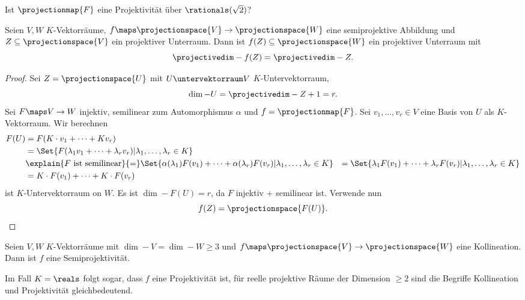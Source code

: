 \begin{frage*}
  Ist \( \projectionmap{F} \) eine Projektivität über \( \rationals(\sqrt{2}) \)?
\end{frage*}
\begin{lemma}
  Seien \( V,W \) \( K \)-Vektorräume, \( f\maps \projectionspace{V}\to \projectionspace{W} \) eine semiprojektive Abbildung und \( Z\subseteq \projectionspace{V} \) ein projektiver Unterraum. Dann ist \( f(Z)\subseteq \projectionspace{W} \) ein projektiver Unterraum mit 
  \begin{equation*}
    \projectivedim-{f(Z)}=\projectivedim-{Z}.
  \end{equation*}
\end{lemma}
\begin{proof}
  Sei \( Z=\projectionspace{U} \) mit \( U\untervektorraum V \) \( K \)-Untervektorraum,
  \begin{equation*}
    \dim-{}{U}=\projectivedim-{Z}+1=r.
  \end{equation*}
  Sei \( F\maps V\to W \) injektiv, semilinear zum Automorphismus \( \alpha \) und \( f=\projectionmap{F} \). Sei \( v_1,\dotsc,v_r\in V \) eine Basis von \( U \) als \( K \)-Vektorraum. Wir berechnen
  \begin{align*}
    F(U)&=F(K\cdot v_1+\dotsb+K v_r)\\
    &=\Set{F(\lambda_1 v_1+\dotsb+\lambda_r v_r)|\lambda_1,\dotsc,\lambda_r\in K}\\
    &\explain{F \text{ ist semilinear}}{=}\Set{\alpha(\lambda_1)F(v_1)+\dotsb+\alpha(\lambda_r)F(v_r)|\lambda_1,\dotsc,\lambda_r\in K}
    &=\Set{\lambda_1 F(v_1)+\dotsb+\lambda_r F(v_r)|\lambda_1,\dotsc,\lambda_r\in K}\\
    &=K\cdot F(v_1)+\dotsb+K\cdot F(v_r)
  \end{align*}
  ist \( K \)-Untervektorraum on \( W \). Es ist \( \dim-{}{F(U)}=r \), da \( F \) injektiv + semilinear ist. Verwende nun
  \begin{equation*}
    f(Z)=\projectionspace{F(U)}.
  \end{equation*}  
\end{proof}
\begin{satz}\label{hauptsatz_projektive_geometrie}
  Seien \( V,W \) \( K \)-Vektorräume mit \( \dim-{}{V}=\dim-{}{W}\geq 3 \) und \( f\maps \projectionspace{V}\to\projectionspace{W} \) eine Kollineation. Dann ist \( f \) eine Semiprojektivität.
\end{satz}
\begin{bemerkung*}
  Im Fall \( K=\reals \) folgt sogar, dass \( f \) eine Projektivität ist, \dh für reelle projektive Räume der Dimension \( \geq 2 \) sind die Begriffe Kollineation und Projektivität gleichbedeutend.
\end{bemerkung*}
